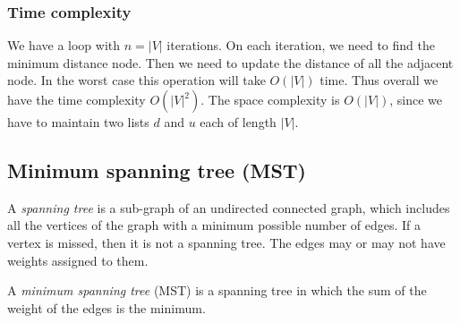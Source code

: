 \documentclass[a4paper,11pt]{book}
\begin{document}
\subsubsection{Time complexity}
\noindent We have a loop with $n=|V|$ iterations. On each iteration, we need to find the minimum distance node. Then we need to update the distance of all the adjacent node. In the worst case this operation will take $O(|V|)$ time. Thus overall we have the time complexity $O(|V|^2)$. The space complexity is $O(|V|)$, since we have to maintain two lists $d$ and $u$ each of length $|V|$.


\subsection{Minimum spanning tree (MST)}

\noindent A \textit{spanning tree} is a sub-graph of an undirected connected graph, which includes all the vertices of the graph with a minimum possible number of edges. If a vertex is missed, then it is not a spanning tree. The edges may or may not have weights assigned to them. 

\noindent A \textit{minimum spanning tree} (MST) is a spanning tree in which the sum of the weight of the edges is the minimum.
\end{document}
